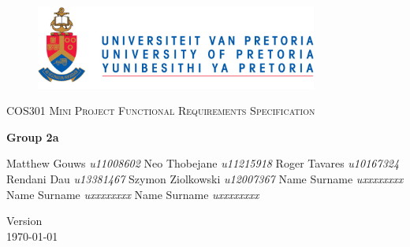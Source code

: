 \begin{titlepage}
	\begin{center}
		
		\begin{figure}[t]
			\centering
			\includegraphics[width=350px]{UP_Logo.png}
		\end{figure}
		
		\textsc{\LARGE COS301 Mini Project Functional \newline\newline Requirements Specification}
		
		\textbf{\newline Group 2a} \\
		\begin{flushright} \large
			Matthew Gouws \emph{u11008602} \newline
			Neo Thobejane \emph{u11215918} \newline
			Roger Tavares \emph{u10167324} \newline
			Rendani Dau \emph{u13381467} \newline
			Szymon Ziolkowski \emph{u12007367} \newline
			Name Surname \emph{uxxxxxxxx} \newline
			Name Surname \emph{uxxxxxxxx} \newline
			Name Surname \emph{uxxxxxxxx} \newline
		\end{flushright}
		
		\vfill
		
		{\large Version }
		\\
		{\large \today}
		
	\end{center}
\end{titlepage}
